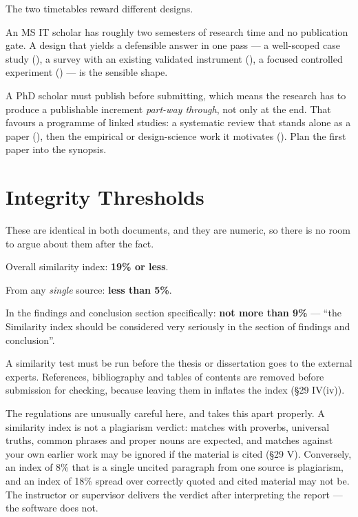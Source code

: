 \begin{conceptbox}
The two timetables reward different designs.

\medskip
An MS IT scholar has roughly two semesters of research time and no publication
gate. A design that yields a defensible answer in one pass --- a well-scoped
case study (), a survey with an existing validated instrument
(), a focused controlled experiment () --- is
the sensible shape.

\medskip
A PhD scholar must publish before submitting, which means the research has to
produce a publishable increment \emph{part-way through}, not only at the end.
That favours a programme of linked studies: a systematic review that stands
alone as a paper (), then the empirical or design-science work it
motivates (). Plan the first paper into the synopsis.
\end{conceptbox}

\section{Integrity Thresholds}

These are identical in both documents, and they are numeric, so there is no
room to argue about them after the fact.

\begin{regbox}
\begin{tight}
  \item Overall similarity index: \textbf{19\% or less}.
  \item From any \emph{single} source: \textbf{less than 5\%}.
  \item In the findings and conclusion section specifically: \textbf{not more
    than 9\%} --- ``the Similarity index should be considered very seriously in
    the section of findings and conclusion''.
\end{tight}
\medskip
A similarity test must be run before the thesis or dissertation goes to the
external experts. References, bibliography and tables of contents are removed
before submission for checking, because leaving them in inflates the index
(\S29 IV(iv)).
\end{regbox}

\begin{conceptbox}
The regulations are unusually careful here, and  takes this
apart properly. A similarity index is not a plagiarism verdict: matches with
proverbs, universal truths, common phrases and proper nouns are expected, and
matches against your own earlier work may be ignored if the material is cited
(\S29 V). Conversely, an index of 8\% that is a single uncited paragraph from
one source is plagiarism, and an index of 18\% spread over correctly quoted and
cited material may not be. The instructor or supervisor delivers the verdict
after interpreting the report --- the software does not.
\end{conceptbox}

